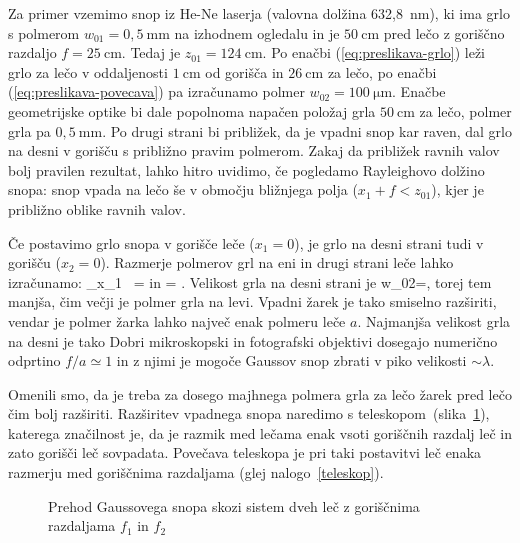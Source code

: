 Za primer vzemimo snop iz He-Ne laserja (valovna dolžina 632,8~nm), ki ima grlo s 
polmerom $w_{01}=0,5~\si{\milli\metre}$ na izhodnem ogledalu in je $50~\si{\centi\metre}$ 
pred lečo z goriščno razdaljo $f=25~\si{\centi\metre}$.
Tedaj je $z_{01}=124~\si{\centi\metre}$. Po enačbi (\ref{eq:preslikava-grlo})
leži grlo za lečo v oddaljenosti $1~\si{\centi\metre}$ od gorišča in $26~\si{\centi\metre}$ 
za lečo, po enačbi (\ref{eq:preslikava-povecava})
pa izračunamo polmer $w_{02}=100~\si{\micro\metre}$. Enačbe geometrijske optike bi
dale popolnoma napačen položaj grla $50~\si{\centi\metre}$ za lečo, polmer grla pa 
$0,5~\si{\milli\metre}$. Po drugi strani bi približek, da je vpadni
snop kar raven, dal grlo na desni v gorišču s približno pravim polmerom. Zakaj da približek ravnih 
valov bolj pravilen rezultat, lahko hitro uvidimo, če pogledamo
Rayleighovo dolžino snopa: snop vpada na lečo še v območju bližnjega polja ($x_1 + f < z_{01}$), kjer 
je približno oblike ravnih valov. 

Če postavimo grlo snopa v gorišče leče ($x_{1}=0$), je grlo na
desni strani tudi v gorišču ($x_{2}=0$). Razmerje polmerov grl
na eni in drugi strani leče lahko izračunamo:
\beq
\lim_{x_1 }~= \qquad \textrm{in} \qquad
{}= .
\eeq
Velikost grla na desni strani je 
\beq
w_{02}=,
\eeq
torej tem manjša, čim večji je polmer grla na levi. Vpadni žarek je tako smiselno
razširiti, vendar je polmer žarka lahko največ enak polmeru leče $a$. 
Najmanjša velikost grla na desni je tako 
Dobri mikroskopski in fotografski
objektivi dosegajo numerično odprtino $f/a\simeq1$ in z njimi je mogoče Gaussov snop
zbrati v piko velikosti $\sim\lambda$. 

Omenili smo, da je treba za dosego majhnega polmera grla za lečo žarek pred lečo čim bolj razširiti.
Razširitev vpadnega snopa naredimo s teleskopom~(slika~\ref{fig:Prehod-Gaussovega-snopa-teleskop}),
katerega značilnost je, da je razmik med lečama enak vsoti goriščnih razdalj leč in zato gorišči
leč sovpadata. Povečava teleskopa je pri taki postavitvi leč enaka razmerju med goriščnima razdaljama 
(glej nalogo~\ref{teleskop}).

\begin{figure}[h]
\def\svgwidth{140truemm} 

\caption{Prehod Gaussovega snopa
skozi sistem dveh leč z goriščnima razdaljama $f_{1}$ in $f_{2}$}
\label{fig:Prehod-Gaussovega-snopa-teleskop}
\end{figure}

